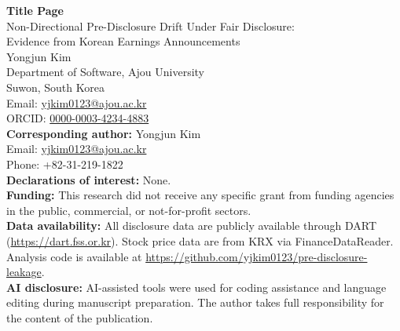 \documentclass[12pt]{article}
\begin{document}
\thispagestyle{empty}

\begin{center}
{\LARGE\bfseries Title Page}\\[2em]

{\Large Non-Directional Pre-Disclosure Drift Under Fair Disclosure:\\
Evidence from Korean Earnings Announcements}\\[3em]

{\large Yongjun Kim}\\[0.5em]
Department of Software, Ajou University\\
Suwon, South Korea\\
Email: \href{mailto:yjkim0123@ajou.ac.kr}{yjkim0123@ajou.ac.kr}\\
ORCID: \href{https://orcid.org/0000-0003-4234-4883}{0000-0003-4234-4883}\\[2em]

\textbf{Corresponding author:} Yongjun Kim\\
Email: \href{mailto:yjkim0123@ajou.ac.kr}{yjkim0123@ajou.ac.kr}\\
Phone: +82-31-219-1822\\[3em]

\textbf{Declarations of interest:} None.\\[1em]

\textbf{Funding:} This research did not receive any specific grant from funding agencies in the public, commercial, or not-for-profit sectors.\\[1em]

\textbf{Data availability:} All disclosure data are publicly available through DART (\url{https://dart.fss.or.kr}). Stock price data are from KRX via FinanceDataReader. Analysis code is available at \url{https://github.com/yjkim0123/pre-disclosure-leakage}.\\[1em]

\textbf{AI disclosure:} AI-assisted tools were used for coding assistance and language editing during manuscript preparation. The author takes full responsibility for the content of the publication.

\end{center}
\end{document}
